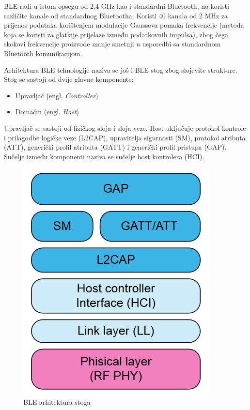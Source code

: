 BLE radi u istom opsegu od 2,4 GHz kao i standardni Bluetooth, no koristi različite kanale od standardnog Bluetootha. Koristi 40 kanala od 2 MHz za prijenos podataka korištenjem modulacije Gaussova pomaka frekvencije (metoda koja se koristi za glatkije prijelaze između podatkovnih impulsa), zbog čega skokovi frekvencije proizvode manje smetnji u usporedbi sa standardnom Bluetooth komunikacijom.

Arhitektura BLE tehnologije naziva se još i BLE stog zbog slojevite strukture. Stog se sastoji od dvije glavne komponente:
\begin{itemize}
	\item Upravljač (engl. \textit{Controller})
	\item Domaćin (engl. \textit{Host})
\end{itemize}

Upravljač se sastoji od fizičkog sloja i sloja veze. Host uključuje protokol kontrole i prilagodbe logičke veze (L2CAP), upravitelja sigurnosti (SM), protokol atributa (ATT), generički profil atributa (GATT) i generički profil pristupa (GAP). Sučelje između komponenti naziva se sučelje host kontrolera (HCI).


\begin{figure}[ht]
		\centering
		\includegraphics[scale=0.5]{imgs/ble_stack_arch}
		\caption{BLE arhitektura stoga}
		\label{fig:ble-stack-arch}
\end{figure}

